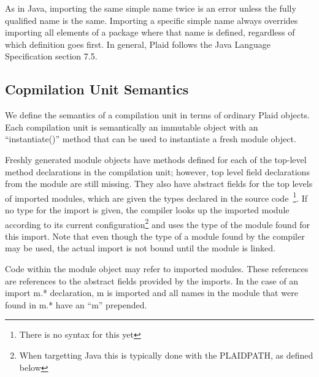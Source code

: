 As in Java, importing the same simple name twice is an error unless
the fully qualified name is the same.  Importing a specific simple
name always overrides importing all elements of a package where
that name is defined, regardless of which definition goes first.
In general, Plaid follows the Java Language Specification section
7.5.


\subsection{Copmilation Unit Semantics}

We define the semantics of a compilation unit in terms of ordinary
Plaid objects.  Each compilation unit is semantically an immutable
object with an ``instantiate()'' method that can be used to
instantiate a fresh module object.

Freshly generated module objects have methods defined for each of the
top-level method declarations in the compilation unit; however, top
level field declarations from the module are still missing.  They also
have abstract fields for the top levels of imported modules, which are
given the types declared in the source code~\footnote{There is no
  syntax for this yet}.  If no type for the import is given, the
compiler looks up the imported module according to its current
configuration\footnote{When targetting Java this is typically done
  with the PLAIDPATH, as defined below} and uses the type of the
module found for this import.  Note that even though the type of a
module found by the compiler may be used, the actual import is not
bound until the module is linked.


Code within the module object may refer to imported modules.  These
references are references to the abstract fields provided by the
imports.  In the case of an import m.* declaration, m is imported and
all names in the module that were found in m.* have an ``m''
prepended.

